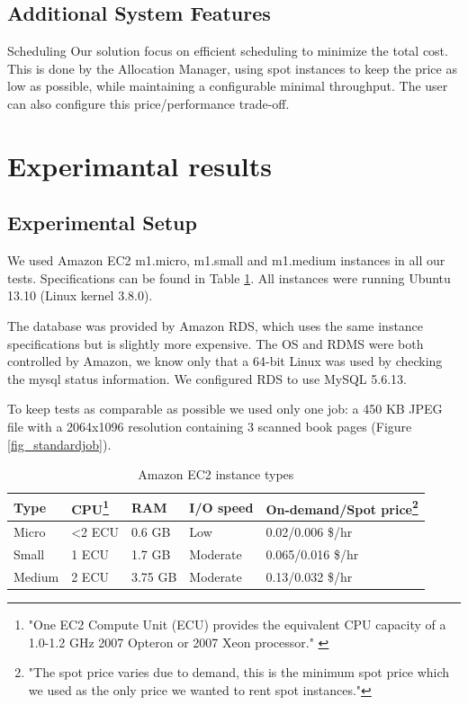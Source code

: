 \documentclass[a4paper]{IEEEtran}
\begin{document}
\subsection*{Additional System Features}

\begin{LaTeXdescription}
\item[Scheduling]
Our solution focus on efficient scheduling to minimize the total cost. This is done by the Allocation Manager, using spot instances to keep the price as low as possible, while maintaining a configurable minimal throughput.
The user can also configure this price/performance trade-off.

\end{LaTeXdescription}

\section{Experimantal results}

\subsection{Experimental Setup}

We used Amazon EC2 m1.micro, m1.small and m1.medium instances in all our tests. Specifications can be found in Table \ref{amazoninstancespec}. All instances were running Ubuntu 13.10 (Linux kernel 3.8.0).

The database was provided by Amazon RDS, which uses the same instance specifications but is slightly more expensive. The OS and RDMS were both controlled by Amazon, we know only that a 64-bit Linux was used by checking the mysql status information. We configured RDS to use MySQL 5.6.13.

To keep tests as comparable as possible we used only one job: a 450 KB JPEG file with a 2064x1096 resolution containing 3 scanned book pages (Figure \ref{fig_standardjob}).

\begin{savenotes}
\begin{table}
\caption{Amazon EC2 instance types}
\label{amazoninstancespec}
\centering
\begin{tabular}{| l | l | l | l | l |}
\hline
Type & CPU\footnote{"One EC2 Compute Unit (ECU) provides the equivalent CPU capacity of a 1.0-1.2 GHz 2007 Opteron or 2007 Xeon processor." \cite{amazonecu}} & RAM & I/O speed & On-demand/Spot price\footnote{"The spot price varies due to demand, this is the minimum spot price which we used as the only price we wanted to rent spot instances."} \\ \hline
Micro & \textless 2 ECU & 0.6 GB & Low & 0.02/0.006 \$/hr \\ \hline
Small & 1 ECU & 1.7 GB & Moderate & 0.065/0.016 \$/hr \\ \hline
Medium & 2 ECU & 3.75 GB & Moderate & 0.13/0.032 \$/hr \\ \hline
\end{tabular}
\end{table}
\end{savenotes}
\end{document}

